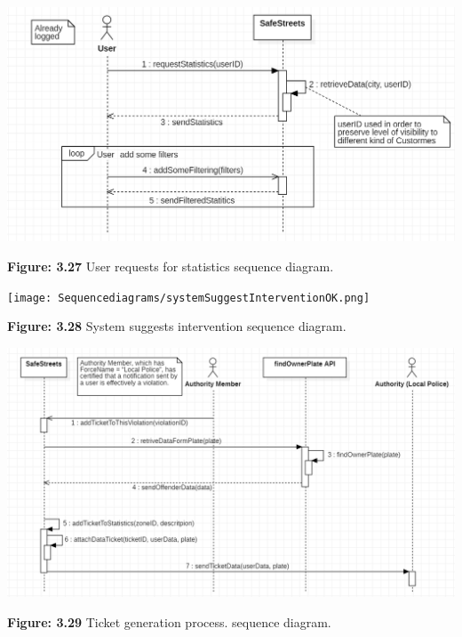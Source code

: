 \documentclass[12pt]{article}
\begin{document}
\vspace{2cm}

\includegraphics[scale=0.57]{Sequencediagrams/userRequestStatstics.png}                  
		 
		  \textbf{Figure: 3.27} User requests for statistics sequence diagram.

\newpage
\texttt{[image: Sequencediagrams/systemSuggestInterventionOK.png]}                  
		 
		  \textbf{Figure: 3.28} System suggests intervention
sequence diagram.

\includegraphics[scale=0.69]{Sequencediagrams/ticketGenerationProcess.png}                  
		 
		  \textbf{Figure: 3.29} Ticket generation process.
sequence diagram.
		  
\newpage		  
		  
\vspace{5mm}
\end{document}
